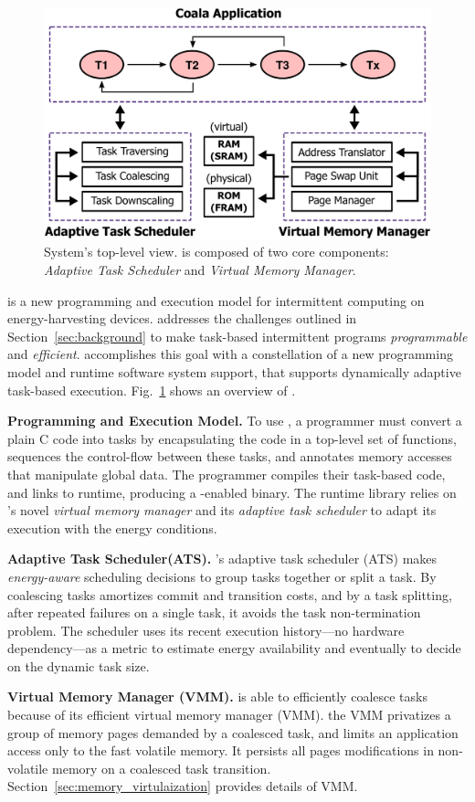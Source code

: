 \begin{figure}
	\centering
	\includegraphics[width=\columnwidth]{figures/overview.pdf}
	\caption{System's top-level view. \sys is composed of two core components: \emph{Adaptive Task Scheduler} and \emph{Virtual Memory Manager}.}
	\label{fig:system_overview}
\end{figure}
%
\sys is a new programming and execution model for intermittent computing on energy-harvesting devices. \sys addresses the challenges outlined in Section~\ref{sec:background} to make task-based intermittent programs {\em programmable} and {\em efficient}. \sys accomplishes this goal with a constellation of a new programming model and runtime software system support, that supports dynamically adaptive task-based execution. Fig.~\ref{fig:system_overview} shows an overview of \sys.

\textbf{Programming and Execution Model.}  To use \sys, a programmer must convert a plain C code into tasks by encapsulating the code in a top-level set of functions, sequences the control-flow between these tasks, and annotates memory accesses that manipulate global data.
The programmer compiles their task-based code, and links to \sys runtime,
producing a \sys-enabled binary. The runtime library relies on \sys's novel
{\em virtual memory manager} and its {\em adaptive task scheduler} to adapt its execution with the energy conditions.

\textbf{Adaptive Task Scheduler(ATS).} 
\sys's adaptive task scheduler (ATS) makes \emph{energy-aware} scheduling decisions to group tasks together or split a task. By coalescing tasks \sys amortizes commit and transition costs, and by a task splitting, after repeated failures on a single task, it avoids the task non-termination problem. The scheduler uses its recent execution history---no hardware dependency---as a metric to estimate energy availability and eventually to decide on the dynamic task size. 

\textbf{Virtual Memory Manager (VMM).} \sys is able to efficiently coalesce
tasks because of its efficient virtual memory manager (VMM).
the VMM privatizes a group of memory pages demanded by a coalesced task, and limits an application access only to the fast volatile memory. It persists all pages modifications in non-volatile memory on a coalesced task transition. Section~\ref{sec:memory_virtulaization} provides details of VMM.
